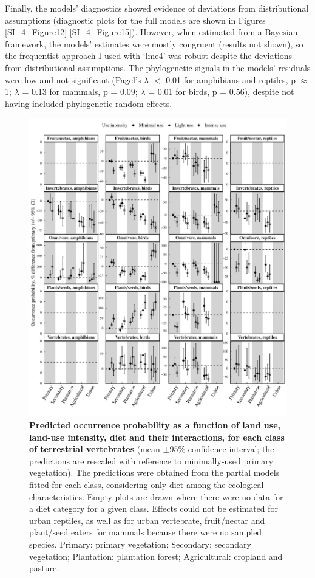 Finally, the models' diagnostics showed evidence of deviations from distributional assumptions (diagnostic plots for the full models are shown in Figures \ref{SI_4_Figure12}-\ref{SI_4_Figure15}). However, when estimated from a Bayesian framework, the models’ estimates were mostly congruent (results not shown), so the frequentist approach I used with `lme4' was robust despite the deviations from distributional assumptions. The phylogenetic signals in the models' residuals were low and not significant (Pagel’s $\lambda$ $<$ 0.01 for amphibians and reptiles, p $\approx$ 1; $\lambda$  = 0.13 for mammals, p = 0.09; $\lambda$  = 0.01 for birds, p = 0.56), despite not having included phylogenetic random effects.

\pagebreak
\begin{figure}[h!]
\centering
\includegraphics[scale=0.7]{figures/Chapter4/Figure3_V2}
\caption[Predicted occurrence probability as a function of land use, land-use intensity, diet and their interactions, for each class of terrestrial vertebrates.]{\textbf{Predicted occurrence probability as a function of land use, land-use intensity, diet and their interactions, for each class of terrestrial vertebrates} (mean $\pm$95\% confidence interval; the predictions are rescaled with reference to minimally-used primary vegetation). The predictions were obtained from the partial models fitted for each class, considering only diet among the ecological characteristics. Empty plots are drawn where there were no data for a diet category for a given class. Effects could not be estimated for urban reptiles, as well as for urban vertebrate, fruit/nectar and plant/seed eaters for mammals because there were no sampled species. Primary: primary vegetation; Secondary: secondary vegetation; Plantation: plantation forest; Agricultural: cropland and pasture.}
\label{chap4_fig3}
\end{figure}


